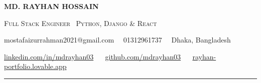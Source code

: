 \documentclass[a4paper,10pt]{article}
\newcommand{\dotsep}{\ \textperiodcentered\ }
\begin{document}
\begin{center}
  {\Huge\bfseries MD. RAYHAN HOSSAIN}\par\vspace{4pt}
  {\large\color{accent}\scshape Full Stack Engineer \textbar\ Python, Django \& React}\par\vspace{6pt}
  {\small mostafaizurrahman2021@gmail.com \dotsep 01312961737 \dotsep Dhaka, Bangladesh}\par\vspace{2.5pt}
  {\small \href{https://www.linkedin.com/in/mdrayhan03/}{linkedin.com/in/mdrayhan03} \dotsep
          \href{https://github.com/mdrayhan03}{github.com/mdrayhan03} \dotsep
          \href{https://rayhan-portfolio.lovable.app}{rayhan-portfolio.lovable.app}}
\end{center}
\vspace{4pt}\noindent\textcolor{hairline}{\rule{\textwidth}{1pt}}\par\vspace{2pt}
\end{document}
